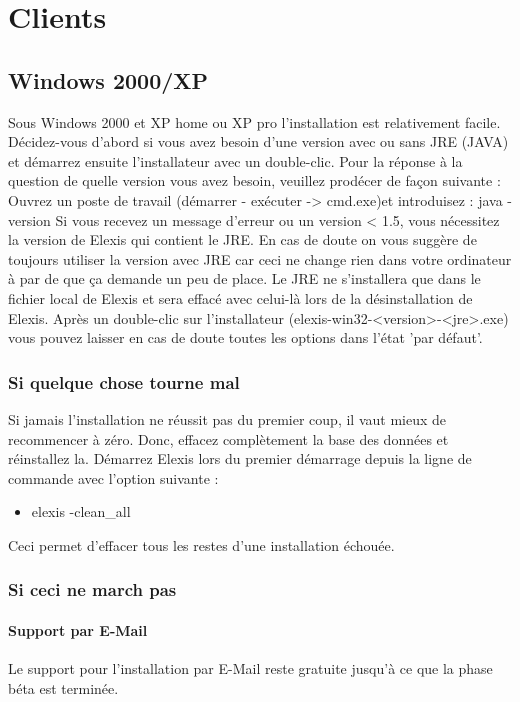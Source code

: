 \chapter{Clients}
\section{Windows 2000/XP}
Sous Windows 2000 et XP home ou XP pro l'installation est relativement facile. Décidez-vous d'abord si vous avez besoin d'une version avec ou sans JRE (JAVA) et démarrez ensuite l'installateur avec un double-clic.
Pour la réponse à la question de quelle version vous avez besoin, veuillez prodécer de façon suivante :
Ouvrez un poste de travail (démarrer - exécuter -> cmd.exe)et introduisez :
java -version
Si vous recevez un message d'erreur ou un version < 1.5, vous nécessitez la version de Elexis qui contient le JRE.
En cas de doute on vous suggère de toujours utiliser la version avec JRE car ceci ne change rien dans votre ordinateur à par  de que ça demande un peu de place. Le JRE ne s'installera que dans le fichier local de Elexis et sera effacé avec celui-là lors de la désinstallation de Elexis. 
Après un double-clic sur l'installateur (elexis-win32-<version>-<jre>.exe) vous pouvez laisser en cas de doute toutes les options dans l'état 'par défaut'.
\subsection{Si quelque chose tourne mal}
Si jamais l'installation ne réussit pas du premier coup, il vaut mieux de recommencer à zéro. Donc, effacez complètement la base des données et réinstallez la. Démarrez Elexis lors du premier démarrage depuis la ligne de commande avec l'option suivante :
\begin{itemize}
\item elexis -clean\_all
\end{itemize}


Ceci permet d'effacer tous les restes d'une installation échouée. 
\subsection{Si ceci ne march pas}
\subsubsection{Support par E-Mail}

Le support pour l'installation par E-Mail reste gratuite jusqu'à ce que la phase béta est terminée.
